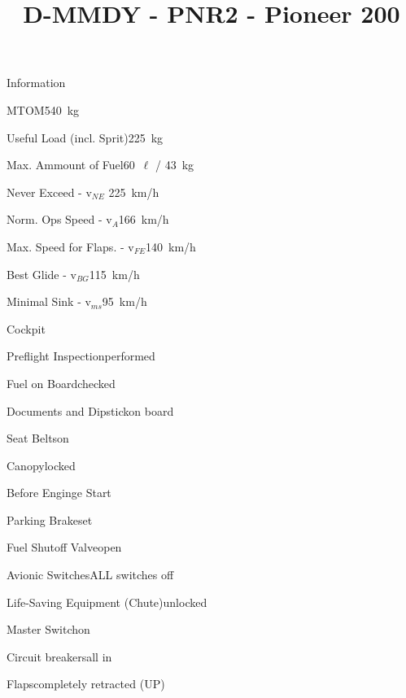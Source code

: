 \def\papersize{4}




\title{D-MMDY  -  PNR2  -  Pioneer 200}

\begin{checklist}{Information}
 	\item{MTOM}{540~kg}
  	\item{Useful Load (incl. Sprit)}{225~kg}
  	\item{Max. Ammount of Fuel}{60~${\ell}$ / 43~kg}
 	  \item{Never Exceed  -  v$_{NE}$ }{ 225~km/h}
	  \item{Norm. Ops Speed  -  v$_{A}$}{166~km/h}
	  \item{Max. Speed for Flaps.  -  v$_{FE}$}{140~km/h}
	  \item{Best Glide  -  v$_{BG}$}{115~km/h}
	  \item{Minimal Sink  -  v$_{ms}$}{95~km/h}
\end{checklist}

\begin{checklist}{Cockpit}
	\item{Preflight Inspection}{performed}
	\item{Fuel on Board}{checked}
	\item{Documents and Dipstick}{on board}
	\item{Seat Belts}{on}
	\item{Canopy}{locked}
\end{checklist}

\begin{checklist}{Before Enginge Start}
	\item{Parking Brake}{set}
	\item{Fuel Shutoff Valve}{open}
	\item{Avionic Switches}{ALL switches off}
	\item{Life-Saving Equipment (Chute)}{unlocked}
	\item{Master Switch}{on}
	\item{Circuit breakers}{all in}
	\item{Flaps}{completely retracted (UP)}
\end{checklist}

